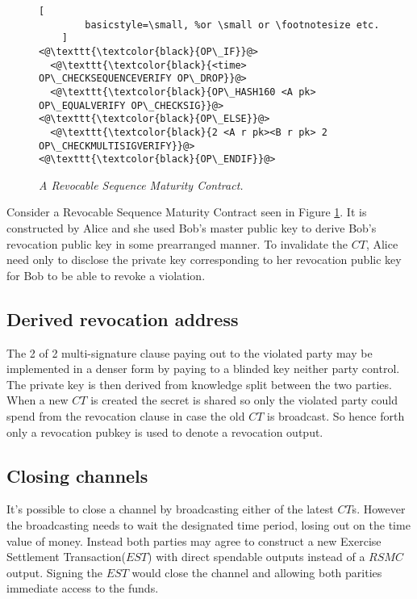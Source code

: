\begin{figure}[hbt!]
	\centering
	\begin{lstlisting}[
		basicstyle=\small, %or \small or \footnotesize etc.
	]
<@\texttt{\textcolor{black}{OP\_IF}}@>
  <@\texttt{\textcolor{black}{<time> OP\_CHECKSEQUENCEVERIFY OP\_DROP}}@>
  <@\texttt{\textcolor{black}{OP\_HASH160 <A pk> OP\_EQUALVERIFY OP\_CHECKSIG}}@>
<@\texttt{\textcolor{black}{OP\_ELSE}}@>
  <@\texttt{\textcolor{black}{2 <A r pk><B r pk> 2 OP\_CHECKMULTISIGVERIFY}}@>
<@\texttt{\textcolor{black}{OP\_ENDIF}}@>
	\end{lstlisting}
	
	\caption{\textit{ A Revocable Sequence Maturity Contract.
	}}
	\label{fig:RSMC}
\end{figure}

Consider a Revocable Sequence Maturity Contract seen in Figure \ref{fig:RSMC}. It is constructed by Alice and she used Bob's master public key to derive Bob's revocation public key in some prearranged manner. To invalidate the $CT$, Alice need only to disclose the private key corresponding to her revocation public key for Bob to be able to revoke a violation. 

\subsection{Derived revocation address}

The 2 of 2 multi-signature clause paying out to the violated party may be implemented in a denser form by paying to a blinded key neither party control. The private key is then derived from knowledge split between the two parties. When a new $CT$ is created the secret is shared so only the violated party could spend from the revocation clause in case the old $CT$ is broadcast. So hence forth only a revocation pubkey is used to denote a revocation output.

\subsection{Closing channels}

It's possible to close a channel by broadcasting either of the latest $CT$s. However the broadcasting needs to wait the designated time period, losing out on the time value of money. Instead both parties may agree to construct a new Exercise Settlement Transaction($EST$) with direct spendable outputs instead of a $RSMC$ output. Signing the $EST$ would close the channel and allowing both parities immediate access to the funds.

